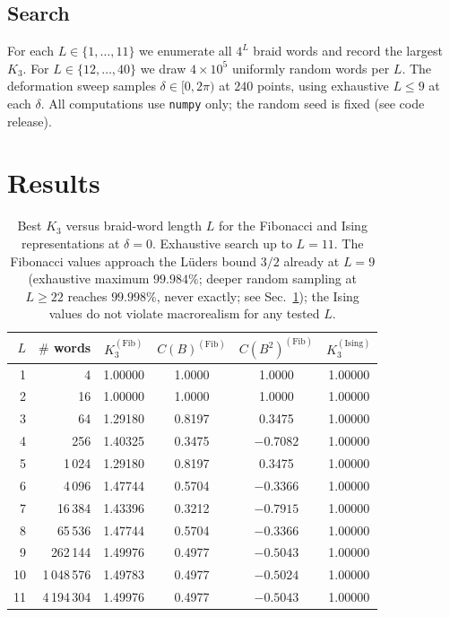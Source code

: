 \documentclass[aps,prx,reprint,amsmath,amssymb,floatfix,nofootinbib,superscriptaddress]{revtex4-2}
\begin{document}
\subsection{Search}

For each $L \in \{1,\ldots,11\}$ we enumerate all $4^{L}$ braid words
and record the largest $K_{3}$. For $L \in \{12,\ldots,40\}$ we draw
$4\times 10^{5}$ uniformly random words per $L$. The deformation sweep
samples $\delta \in [0, 2\pi)$ at $240$ points, using exhaustive
$L \leq 9$ at each $\delta$. All computations use
\texttt{numpy} only; the random seed is fixed (see code release).

\section{Results}
\label{sec:results}

\begin{table}
\caption{Best $K_{3}$ versus braid-word length $L$ for the Fibonacci
and Ising representations at $\delta=0$. Exhaustive search up to
$L=11$. The Fibonacci values approach the L\"uders bound $3/2$
already at $L=9$ (exhaustive maximum $99.984\%$; deeper random
sampling at $L\ge 22$ reaches $99.998\%$, never exactly; see
Sec.~\ref{sec:results}); the Ising values do not violate macrorealism
for any tested $L$.}
\label{tab:K3_L}
\centering
\begin{tabular}{rrcccc}
\toprule
$L$ & $\#$ words & $K_{3}^{(\mathrm{Fib})}$ & $C(B)^{(\mathrm{Fib})}$
    & $C(B^{2})^{(\mathrm{Fib})}$ & $K_{3}^{(\mathrm{Ising})}$ \\
\midrule
1  & 4         & 1.00000 &  1.0000 &  1.0000 & 1.00000 \\
2  & 16        & 1.00000 &  1.0000 &  1.0000 & 1.00000 \\
3  & 64        & 1.29180 &  0.8197 &  0.3475 & 1.00000 \\
4  & 256       & 1.40325 &  0.3475 & $-0.7082$ & 1.00000 \\
5  & 1\,024    & 1.29180 &  0.8197 &  0.3475 & 1.00000 \\
6  & 4\,096    & 1.47744 &  0.5704 & $-0.3366$ & 1.00000 \\
7  & 16\,384   & 1.43396 &  0.3212 & $-0.7915$ & 1.00000 \\
8  & 65\,536   & 1.47744 &  0.5704 & $-0.3366$ & 1.00000 \\
9  & 262\,144  & 1.49976 &  0.4977 & $-0.5043$ & 1.00000 \\
10 & 1\,048\,576 & 1.49783 & 0.4977 & $-0.5024$ & 1.00000 \\
11 & 4\,194\,304 & 1.49976 & 0.4977 & $-0.5043$ & 1.00000 \\
\bottomrule
\end{tabular}
\end{table}
\end{document}
